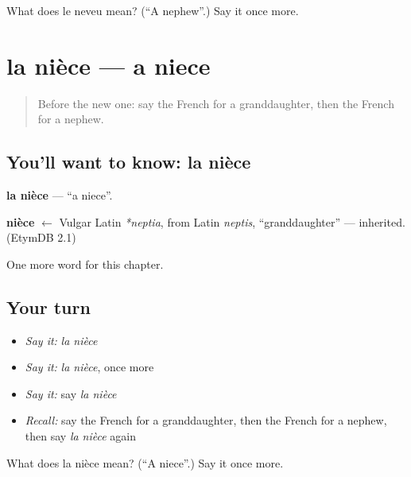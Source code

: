 \begin{tcolorbox}[breakable,colback=teal!4,colframe=teal!35!black,title={Before you move on}]
What does le neveu mean? (\textquotedblleft{}A nephew\textquotedblright{}.) Say it once more.
\end{tcolorbox}
\section[la nièce]{la nièce — a niece}

\label{lesson:FR-C59-niece}



\begin{quote}
Before the new one: say the French for a granddaughter, then the French for a nephew.
\end{quote}

\subsection*{You'll want to know: la nièce}
\textbf{la nièce} — \textquotedblleft{}a niece\textquotedblright{}.

\begin{cousinweb}
\textbf{nièce} $\leftarrow$ Vulgar Latin \emph{*neptia}, from Latin \emph{neptis}, \textquotedblleft{}granddaughter\textquotedblright{} — inherited. (EtymDB 2.1)
\end{cousinweb}

\begin{grammarlens}[title={What you've built}]
One more word for this chapter.
\end{grammarlens}

\subsection*{Your turn}
\begin{itemize}
\raggedright
  \item \emph{Say it:} \emph{la nièce}
  \item \emph{Say it:} \emph{la nièce}, once more
  \item \emph{Say it:} say \emph{la nièce}
  \item \emph{Recall:} say the French for a granddaughter, then the French for a nephew, then say \emph{la nièce} again
\end{itemize}

\begin{tcolorbox}[breakable,colback=teal!4,colframe=teal!35!black,title={Before you move on}]
What does la nièce mean? (\textquotedblleft{}A niece\textquotedblright{}.) Say it once more.
\end{tcolorbox}
